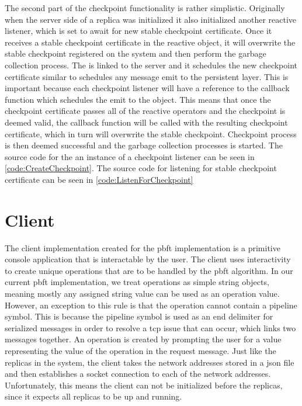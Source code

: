 The second part of the checkpoint functionality is rather simplistic. Originally when the server side of a replica was initialized it also initialized another reactive listener, which is set to await for new stable checkpoint certificate. Once it receives a stable checkpoint certificate in the reactive  object, it will overwrite the stable checkpoint registered on the system and then perform the garbage collection process. The  is linked to the server and it schedules the new checkpoint certificate similar to schedules any message emit to the persistent layer. This is important because each checkpoint listener will have a reference to the callback function which schedules the emit to the  object. This means that once the checkpoint certificate passes all of the reactive operators and the checkpoint is deemed valid, the callback function will be called with the resulting checkpoint certificate, which in turn will overwrite the stable checkpoint. Checkpoint process is then deemed successful and the garbage collection processes is started. The source code for the an instance of a checkpoint listener can be seen in \autoref{code:CreateCheckpoint}. The source code for listening for stable checkpoint certificate can be seen in \autoref{code:ListenForCheckpoint}
\fi

\section{Client}
The client implementation created for the \ac{pbft} implementation is a primitive console application that is interactable by the user. The client uses interactivity to create unique operations that are to be handled by the \ac{pbft} algorithm. In our current \ac{pbft} implementation, we treat operations as simple string objects, meaning mostly any assigned string value can be used as an operation value. However, an exception to this rule is that the operation cannot contain a pipeline symbol. This is because the pipeline symbol is used as an end delimiter for serialized messages in order to resolve a \ac{tcp} issue that can occur, which links two messages together. An operation is created by prompting the user for a value representing the value of the operation in the request message. 
Just like the replicas in the system, the client takes the network addresses stored in a \ac{json} file and then establishes a socket connection to each of the network addresses. Unfortunately, this means the client can not be initialized before the replicas, since it expects all replicas to be up and running.

